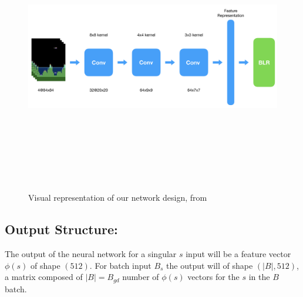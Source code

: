 \documentclass{article}
\begin{document}
\begin{figure}[H]
    \centering
    \includegraphics[width=12cm,height=12cm,keepaspectratio]{img/net.jpeg}
\caption{Visual representation of our network design, from \cite{BDQN}}
\end{figure}

\subsection{Output Structure:}
The output of the neural network for a singular $s$ input will be a feature vector $\phi(s)$ of shape $(512)$. For batch input $B_s$ the output will of shape $(|B|,512)$, a matrix composed of $|B| = B_{gd}$ number of $\phi(s)$ vectors for the $s$ in the $B$ batch.
\end{document}
